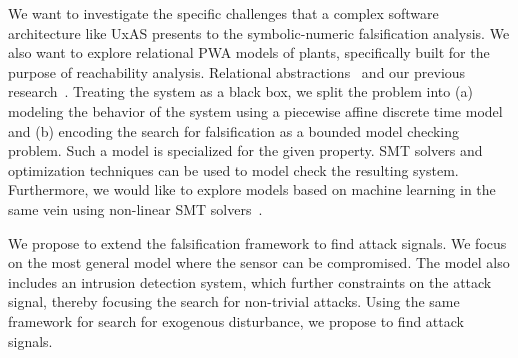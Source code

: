  We want to
investigate the specific challenges that a complex software
architecture like UxAS presents to the symbolic-numeric falsification
analysis. We also want to explore
relational PWA models of
plants, specifically built for the purpose of reachability analysis.
Relational abstractions~\cite{Tiwari2012} and our previous
research~\cite{zutshi2012timed}. Treating the system as a black box,
we split the problem into (a) modeling the behavior of the system
using a piecewise affine discrete time model and (b) encoding the
search for falsification as a bounded model checking problem. Such a
model is specialized for the given property.  SMT solvers and
optimization techniques can be used to model check the resulting
system. Furthermore, we would like to explore models based on machine
learning in the same vein using non-linear SMT
solvers~\cite{gao2013dreal}.



We propose to extend the falsification framework to find attack
signals. We focus on the most general model where the sensor can be
compromised. The model also includes an intrusion detection system,
which further constraints on the attack signal, thereby focusing the
search for non-trivial attacks.  Using the same framework for search
for exogenous disturbance, we propose to find attack signals.











